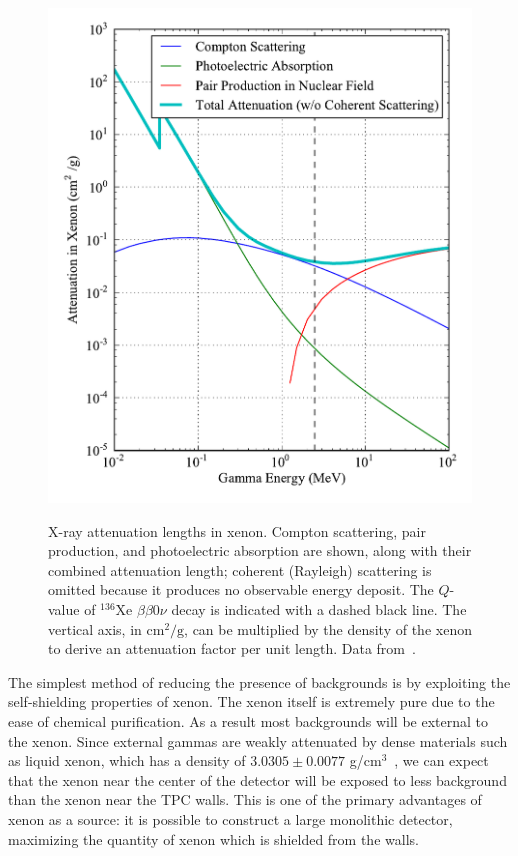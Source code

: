 \begin{figure}
\begin{center}
\includegraphics[keepaspectratio=true,width=\textwidth]{scripts/XrayAttenuationXenon.pdf}
\end{center}
\renewcommand{\baselinestretch}{1}
\small\normalsize
\begin{quote}
\caption{X-ray attenuation lengths in xenon.  Compton scattering, pair production, and photoelectric absorption are shown, along with their combined attenuation length; coherent (Rayleigh) scattering is omitted because it produces no observable energy deposit.  The $Q$-value of $^{136}$Xe $\beta\beta 0\nu$ decay is indicated with a dashed black line.  The vertical axis, in $\text{cm}^2/\text{g}$, can be multiplied by the density of the xenon to derive an attenuation factor per unit length.  Data from~\cite{XcomXenonAttenuation}.}
\label{fig:XrayAttenuationXenon}
\end{quote}
\end{figure}
\renewcommand{\baselinestretch}{2}
\small\normalsize

The simplest method of reducing the presence of backgrounds is by exploiting the self-shielding properties of xenon.  The xenon itself is extremely pure due to the ease of chemical purification.  As a result most backgrounds will be external to the xenon.  Since external gammas are weakly attenuated by dense materials such as liquid xenon, which has a density of $3.0305 \pm 0.0077$ g/cm$^3$~\cite{bb2nEXO2014}, we can expect that the xenon near the center of the detector will be exposed to less background than the xenon near the TPC walls.  This is one of the primary advantages of xenon as a source: it is possible to construct a large monolithic detector, maximizing the quantity of xenon which is shielded from the walls.


